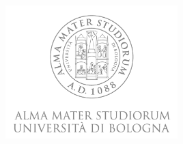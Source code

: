 \documentclass[a4paper,12pt,oneside]{book}
\begin{document}

\pagestyle{myheadings}


\thispagestyle{empty}  
                                               

\begin{center}
	\includegraphics[width=0.5\textwidth]{Logo_unibo.png}
\end{center}
\end{document}
